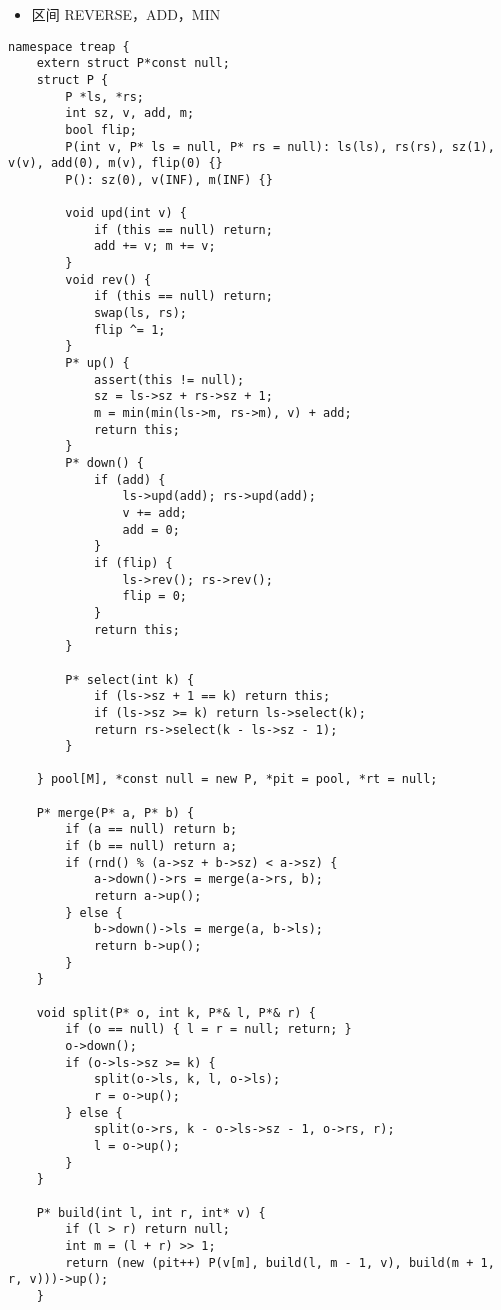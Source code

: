 \documentclass[]{article}
\providecommand{\tightlist}{%
  \setlength{\itemsep}{0pt}\setlength{\parskip}{0pt}}
\begin{document}
\begin{itemize}
\tightlist
\item
  区间 REVERSE，ADD，MIN
\end{itemize}

\begin{verbatim}
namespace treap {
    extern struct P*const null;
    struct P {
        P *ls, *rs;
        int sz, v, add, m;
        bool flip;
        P(int v, P* ls = null, P* rs = null): ls(ls), rs(rs), sz(1), v(v), add(0), m(v), flip(0) {}
        P(): sz(0), v(INF), m(INF) {}

        void upd(int v) {
            if (this == null) return;
            add += v; m += v;
        }
        void rev() {
            if (this == null) return;
            swap(ls, rs);
            flip ^= 1;
        }
        P* up() {
            assert(this != null);
            sz = ls->sz + rs->sz + 1;
            m = min(min(ls->m, rs->m), v) + add;
            return this;
        }
        P* down() {
            if (add) {
                ls->upd(add); rs->upd(add);
                v += add;
                add = 0;
            }
            if (flip) {
                ls->rev(); rs->rev();
                flip = 0;
            }
            return this;
        }

        P* select(int k) {
            if (ls->sz + 1 == k) return this;
            if (ls->sz >= k) return ls->select(k);
            return rs->select(k - ls->sz - 1);
        }

    } pool[M], *const null = new P, *pit = pool, *rt = null;

    P* merge(P* a, P* b) {
        if (a == null) return b;
        if (b == null) return a;
        if (rnd() % (a->sz + b->sz) < a->sz) {
            a->down()->rs = merge(a->rs, b);
            return a->up();
        } else {
            b->down()->ls = merge(a, b->ls);
            return b->up();
        }
    }

    void split(P* o, int k, P*& l, P*& r) {
        if (o == null) { l = r = null; return; }
        o->down();
        if (o->ls->sz >= k) {
            split(o->ls, k, l, o->ls);
            r = o->up();
        } else {
            split(o->rs, k - o->ls->sz - 1, o->rs, r);
            l = o->up();
        }
    }

    P* build(int l, int r, int* v) {
        if (l > r) return null;
        int m = (l + r) >> 1;
        return (new (pit++) P(v[m], build(l, m - 1, v), build(m + 1, r, v)))->up();
    }


\end{verbatim}
\end{document}
